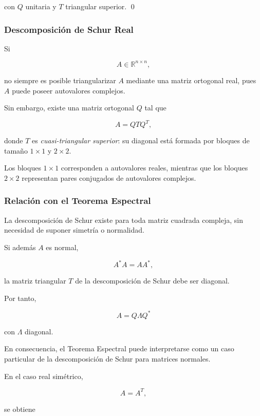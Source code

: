 \documentclass[12pt]{article}
\begin{document}
con $Q$ unitaria y $T$ triangular superior.
\qed


\subsubsection*{Descomposición de Schur Real}

Si

\[
    A\in\mathbb{R}^{n\times n},
\]

no siempre es posible triangularizar $A$ mediante una matriz ortogonal
real, pues $A$ puede poseer autovalores complejos.

Sin embargo, existe una matriz ortogonal $Q$ tal que

\[
    \boxed{
    A=QTQ^T,
    }
\]

donde $T$ es \emph{cuasi-triangular superior}: su diagonal está formada
por bloques de tamaño $1\times1$ y $2\times2$.

Los bloques $1\times1$ corresponden a autovalores reales, mientras que
los bloques $2\times2$ representan pares conjugados de autovalores
complejos.


\subsubsection*{Relación con el Teorema Espectral}

La descomposición de Schur existe para toda matriz cuadrada compleja,
sin necesidad de suponer simetría o normalidad.

Si además $A$ es normal,

\[
    A^*A=AA^*,
\]

la matriz triangular $T$ de la descomposición de Schur debe ser
diagonal.

Por tanto,

\[
    \boxed{
    A=Q\Lambda Q^*
    }
\]

con $\Lambda$ diagonal.

En consecuencia, el Teorema Espectral puede interpretarse como un caso
particular de la descomposición de Schur para matrices normales.

En el caso real simétrico,

\[
    A=A^T,
\]

se obtiene
\end{document}
